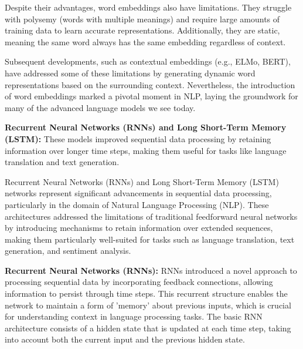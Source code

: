 Despite their advantages, word embeddings also have limitations. They struggle with polysemy (words with multiple meanings) and require large amounts of training data to learn accurate representations. Additionally, they are static, meaning the same word always has the same embedding regardless of context.

Subsequent developments, such as contextual embeddings (e.g., ELMo, BERT), have addressed some of these limitations by generating dynamic word representations based on the surrounding context. Nevertheless, the introduction of word embeddings marked a pivotal moment in NLP, laying the groundwork for many of the advanced language models we see today.

\textbf{Recurrent Neural Networks (RNNs) and Long Short-Term Memory (LSTM):} These models improved sequential data processing by retaining information over longer time steps, making them useful for tasks like language translation and text generation.

Recurrent Neural Networks (RNNs) and Long Short-Term Memory (LSTM) networks represent significant advancements in sequential data processing, particularly in the domain of Natural Language Processing (NLP). These architectures addressed the limitations of traditional feedforward neural networks by introducing mechanisms to retain information over extended sequences, making them particularly well-suited for tasks such as language translation, text generation, and sentiment analysis.

\textbf{Recurrent Neural Networks (RNNs):}
RNNs introduced a novel approach to processing sequential data by incorporating feedback connections, allowing information to persist through time steps. This recurrent structure enables the network to maintain a form of 'memory' about previous inputs, which is crucial for understanding context in language processing tasks. The basic RNN architecture consists of a hidden state that is updated at each time step, taking into account both the current input and the previous hidden state.

